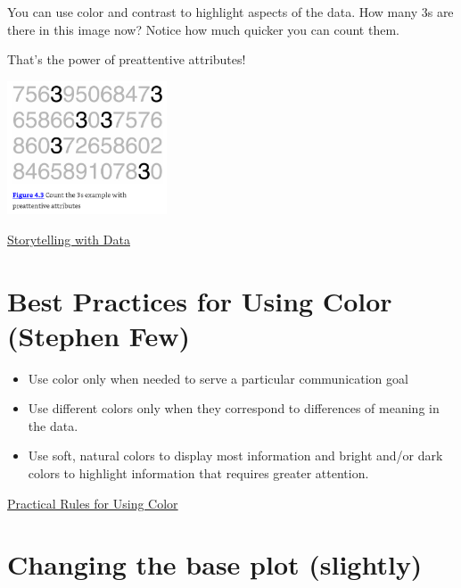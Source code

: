 \documentclass[
  letterpaper,
  DIV=11,
  numbers=noendperiod]{scrreprt}
\providecommand{\tightlist}{%
  \setlength{\itemsep}{0pt}\setlength{\parskip}{0pt}}\usepackage{longtable,booktabs,array}
\begin{document}

You can use color and contrast to highlight aspects of the data. How
many 3s are there in this image now? Notice how much quicker you can
count them.

That's the power of preattentive attributes!

\includegraphics[width=1.86in,height=\textheight]{image/threes.png}

\href{http://storytellingwithdata.com/}{Storytelling with Data}

\section*{Best Practices for Using Color (Stephen
Few)}\label{best-practices-for-using-color-stephen-few}


\begin{itemize}
\tightlist
\item
  Use color only when needed to serve a particular communication goal
\item
  Use different colors only when they correspond to differences of
  meaning in the data.
\item
  Use soft, natural colors to display most information and bright and/or
  dark colors to highlight information that requires greater attention.
\end{itemize}

\href{http://www.perceptualedge.com/articles/visual_business_intelligence/rules_for_using_color.pdf}{Practical
Rules for Using Color}

\section*{Changing the base plot
(slightly)}\label{changing-the-base-plot-slightly}

\end{document}

